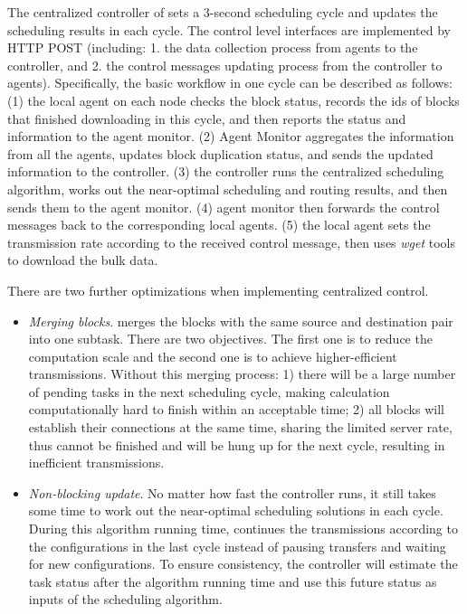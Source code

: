 The centralized controller of \name sets a 3-second scheduling cycle and updates the scheduling results in each cycle. The control level interfaces are implemented by HTTP POST (including: 1. the data collection process from agents to the controller, and 2. the control messages updating process from the controller to agents). Specifically, the basic workflow in one cycle can be described as follows: (1) the local agent on each node checks the block status, records the ids of blocks that finished downloading in this cycle, and then reports the status and information to the agent monitor. (2) Agent Monitor aggregates the information from all the agents, updates block duplication status, and sends the updated information to the controller. (3) the controller runs the centralized scheduling algorithm, works out the near-optimal scheduling and routing results, and then sends them to the agent monitor. (4) agent monitor then forwards the control messages back to the corresponding local agents. (5) the local agent sets the transmission rate according to the received control message, then uses \emph{wget} tools to download the bulk data.

There are two further optimizations when implementing centralized control.
\begin{itemize}
\item \emph{Merging blocks}. \name merges the blocks with the same source and destination pair into one subtask. There are two objectives. The first one is to reduce the computation scale and the second one is to achieve higher-efficient transmissions. Without this merging process: 1) there will be a large number of pending tasks in the next scheduling cycle, making calculation computationally hard to finish within an acceptable time; 2) all blocks will establish their connections at the same time, sharing the limited server rate, thus cannot be finished and will be hung up for the next cycle, resulting in inefficient transmissions.
\item \emph{Non-blocking update}. No matter how fast the controller runs, it still takes some time to work out the near-optimal scheduling solutions in each cycle. During this algorithm running time, \name continues the transmissions according to the configurations in the last cycle instead of pausing transfers and waiting for new configurations. To ensure consistency, the controller will estimate the task status after the algorithm running time and use this future status as inputs of the scheduling algorithm.
\end{itemize}


